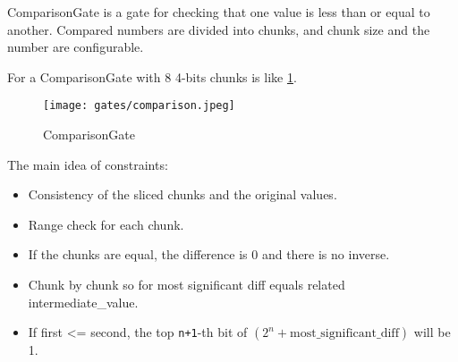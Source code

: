 
\hspace*{\fill}

\indent ComparisonGate is a gate for checking that one value is less than or equal to another. 
Compared numbers are divided into chunks, and chunk size and the number are configurable.

For a ComparisonGate with 8 4-bits chunks is like \ref{fig:comparison}.

\begin{figure}[!ht]
    \centering
    \texttt{[image: gates/comparison.jpeg]}
    \caption{ComparisonGate}
    \label{fig:comparison}
\end{figure}

The main idea of constraints:
\begin{itemize}
    \item Consistency of the sliced chunks and the original values.
    \item Range check for each chunk.
    \item If the chunks are equal, the difference is 0 and there is no inverse.
    \item Chunk by chunk so for most significant diff equals related intermediate\_value.
    \item If first <= second, the top \verb|n+1|-th bit of $(2^n + \text{most\_significant\_diff})$ will be 1.
\end{itemize}
